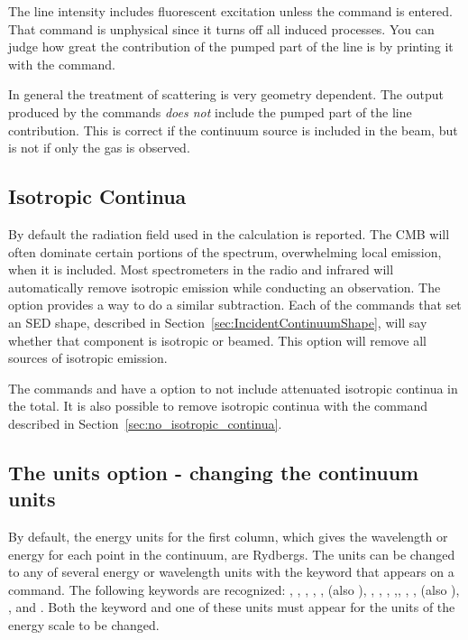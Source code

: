 The line intensity includes fluorescent excitation unless the
 command is entered.
That command is unphysical since it turns
off all induced processes.
You can judge how great the contribution of
the pumped part of the line is by printing it with the
 command.

In general the treatment of scattering is very geometry dependent.
The
output produced by the  commands \emph{does not} include the pumped
part of the line contribution.
This is correct if the continuum source
is included in the beam, but is not if only the gas is observed.

\subsection{Isotropic Continua}
\label{sec:save_cont_no_isotropic_option}

\par
By default the radiation field used in the calculation is reported. 
The CMB will often dominate certain portions of the spectrum,
overwhelming local emission, when it is included.
Most spectrometers in the radio and infrared will automatically remove  
isotropic emission while conducting an observation.
The  option provides a way to do a similar subtraction.
Each of the commands that set an SED shape,
described in Section~\ref{sec:IncidentContinuumShape}, will say
whether that component is isotropic or beamed.
This option will remove all sources of isotropic emission.

The commands
 and
have a  option
to not include attenuated isotropic continua in the total.
It is also possible to remove isotropic continua with the
  command described
in Section~\ref{sec:no_isotropic_continua}.

\subsection{The units option - changing the continuum units}
\label{output_units}
\label{units_option}

By default, the energy units for the first column, which gives the
wavelength or energy for each point in the continuum, are Rydbergs.  The
units can be changed to any of several energy or wavelength units with the
 keyword that appears on a  command.  The following
keywords are recognized: , , ,
, ,  (also
), , , ,
,, , ,
 (also ), , and
.
Both the keyword  and one of
these units must appear for the units of the energy scale to be changed.

